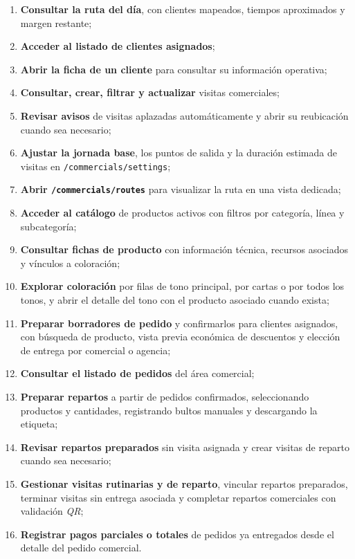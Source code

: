 \begin{enumerate}
    \item \textbf{Consultar la ruta del día}, con clientes mapeados, tiempos aproximados y margen restante;
    \item \textbf{Acceder al listado de clientes asignados};
    \item \textbf{Abrir la ficha de un cliente} para consultar su información operativa;
    \item \textbf{Consultar, crear, filtrar y actualizar} visitas comerciales;
    \item \textbf{Revisar avisos} de visitas aplazadas automáticamente y abrir su reubicación cuando sea necesario;
    \item \textbf{Ajustar la jornada base}, los puntos de salida y la duración estimada de visitas en \texttt{/commercials/settings};
    \item \textbf{Abrir \texttt{/commercials/routes}} para visualizar la ruta en una vista dedicada;
    \item \textbf{Acceder al catálogo} de productos activos con filtros por categoría, línea y subcategoría;
    \item \textbf{Consultar fichas de producto} con información técnica, recursos asociados y vínculos a coloración;
    \item \textbf{Explorar coloración} por filas de tono principal, por cartas o por todos los tonos, y abrir el detalle del tono con el producto asociado cuando exista;
    \item \textbf{Preparar borradores de pedido} y confirmarlos para clientes asignados, con búsqueda de producto, vista previa económica de descuentos y elección de entrega por comercial o agencia;
    \item \textbf{Consultar el listado de pedidos} del área comercial;
    \item \textbf{Preparar repartos} a partir de pedidos confirmados, seleccionando productos y cantidades, registrando bultos manuales y descargando la etiqueta;
    \item \textbf{Revisar repartos preparados} sin visita asignada y crear visitas de reparto cuando sea necesario;
    \item \textbf{Gestionar visitas rutinarias y de reparto}, vincular repartos preparados, terminar visitas sin entrega asociada y completar repartos comerciales con validación \textit{QR};
    \item \textbf{Registrar pagos parciales o totales} de pedidos ya entregados desde el detalle del pedido comercial.
\end{enumerate}


